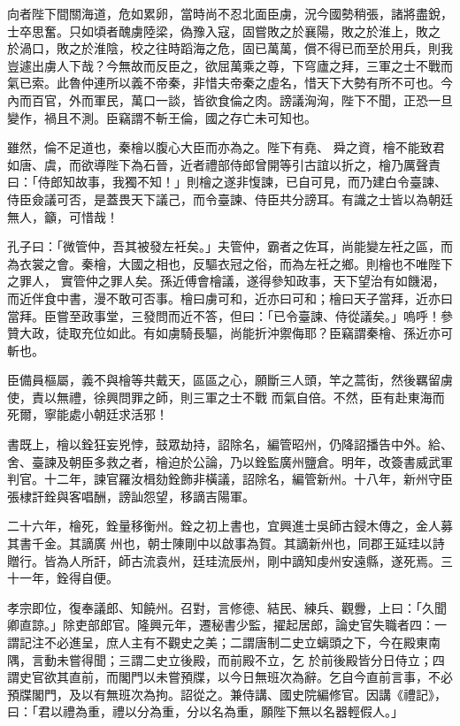 \begin{pinyinscope}
 向者陛下間關海道，危如累卵，當時尚不忍北面臣虜，況今國勢稍張，諸將盡銳，士卒思奮。只如頃者醜虜陸梁，偽豫入寇，固嘗敗之於襄陽，敗之於淮上，敗之
 於渦口，敗之於淮陰，校之往時蹈海之危，固已萬萬，償不得已而至於用兵，則我豈遽出虜人下哉？今無故而反臣之，欲屈萬乘之尊，下穹廬之拜，三軍之士不戰而氣已索。此魯仲連所以義不帝秦，非惜夫帝秦之虛名，惜天下大勢有所不可也。今內而百官，外而軍民，萬口一談，皆欲食倫之肉。謗議洶洶，陛下不聞，正恐一旦變作，禍且不測。臣竊謂不斬王倫，國之存亡未可知也。



 雖然，倫不足道也，秦檜以腹心大臣而亦為之。陛下有堯、
 舜之資，檜不能致君如唐、虞，而欲導陛下為石晉，近者禮部侍郎曾開等引古誼以折之，檜乃厲聲責曰：「侍郎知故事，我獨不知！」則檜之遂非愎諫，已自可見，而乃建白令臺諫、侍臣僉議可否，是蓋畏天下議己，而令臺諫、侍臣共分謗耳。有識之士皆以為朝廷無人，籲，可惜哉！



 孔子曰：「微管仲，吾其被發左衽矣。」夫管仲，霸者之佐耳，尚能變左衽之區，而為衣裳之會。秦檜，大國之相也，反驅衣冠之俗，而為左衽之鄉。則檜也不唯陛下之罪人，
 實管仲之罪人矣。孫近傅會檜議，遂得參知政事，天下望治有如饑渴，而近伴食中書，漫不敢可否事。檜曰虜可和，近亦曰可和；檜曰天子當拜，近亦曰當拜。臣嘗至政事堂，三發問而近不答，但曰：「已令臺諫、侍從議矣。」嗚呼！參贊大政，徒取充位如此。有如虜騎長驅，尚能折沖禦侮耶？臣竊謂秦檜、孫近亦可斬也。



 臣備員樞屬，義不與檜等共戴天，區區之心，願斷三人頭，竿之蒿街，然後羈留虜使，責以無禮，徐興問罪之師，則三軍之士不戰
 而氣自倍。不然，臣有赴東海而死爾，寧能處小朝廷求活邪！



 書既上，檜以銓狂妄兇悖，鼓眾劫持，詔除名，編管昭州，仍降詔播告中外。給、舍、臺諫及朝臣多救之者，檜迫於公論，乃以銓監廣州鹽倉。明年，改簽書威武軍判官。十二年，諫官羅汝楫劾銓飾非橫議，詔除名，編管新州。十八年，新州守臣張棣訐銓與客唱酬，謗訕怨望，移謫吉陽軍。



 二十六年，檜死，銓量移衡州。銓之初上書也，宜興進士吳師古鋟木傳之，金人募其書千金。其謫廣
 州也，朝士陳剛中以啟事為賀。其謫新州也，同郡王延珪以詩贈行。皆為人所訐，師古流袁州，廷珪流辰州，剛中謫知虔州安遠縣，遂死焉。三十一年，銓得自便。



 孝宗即位，復奉議郎、知饒州。召對，言修德、結民、練兵、觀釁，上曰：「久聞卿直諒。」除吏部郎官。隆興元年，遷秘書少監，擢起居郎，論史官失職者四：一謂記注不必進呈，庶人主有不觀史之美；二謂唐制二史立螭頭之下，今在殿東南隅，言動未嘗得聞；三謂二史立後殿，而前殿不立，乞
 於前後殿皆分日侍立；四謂史官欲其直前，而閣門以未嘗預牒，以今日無班次為辭。乞自今直前言事，不必預牒閣門，及以有無班次為拘。詔從之。兼侍講、國史院編修官。因講《禮記》，曰：「君以禮為重，禮以分為重，分以名為重，願陛下無以名器輕假人。」




\end{pinyinscope}
